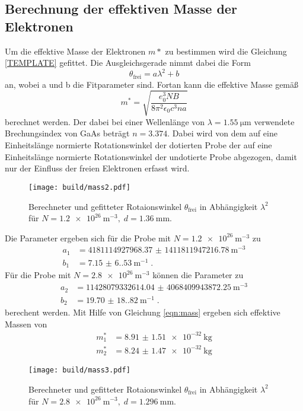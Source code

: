 \subsection{Berechnung der effektiven Masse der Elektronen}
Um die effektive Masse der Elektronen $m*$ zu bestimmen wird die Gleichung \eqref{TEMPLATE} gefittet.
Die Ausgleichsgerade nimmt dabei die Form 
\begin{equation*}
    \theta_\text{frei} = a \lambda^2 + b
\end{equation*}
an, wobei a und b die Fitparameter sind.
Fortan kann die effektive Masse gemäß
\begin{equation}
    m^* = \sqrt{\frac{e_0^3 NB }{8 \pi^2 \epsilon_0 c^3 na}} \label{eqn:mass}
\end{equation}
berechnet werden.
Der dabei bei einer Wellenlänge von $\lambda = \qty{1.55}{\micro\metre}$ verwendete Brechungsindex von GaAs beträgt $n = 3.374$\cite{brechungsindex}.
Dabei wird von dem auf eine Einheitslänge normierte Rotationswinkel der dotierten Probe der auf eine Einheitslänge normierte Rotationswinkel der undotierte Probe abgezogen,
damit nur der Einfluss der freien Elektronen erfasst wird.
\begin{figure}
    \centering
    \texttt{[image: build/mass2.pdf]}
    \caption{Berechneter und gefitteter Rotaionswinkel $\theta_\text{frei}$ in Abhängigkeit $\lambda^2$ für $
    N=\qty{1.2e26}{\meter\tothe{-3}}, \; d = \qty{1,36}{\milli\meter}$.}
    \label{fig:mass2}
\end{figure}
Die Parameter ergeben sich für die Probe mit $N=\qty{1.2e26}{\meter\tothe{-3}}$ zu
\begin{align*}
    a_1 &= \qty{4181114927968.37(141181194721678)}{\metre\tothe{-3}} \\
    b_1 &= \qty{7.15(6.53)}{\metre\tothe{-1}} \; \text{.}
\end{align*}
Für die Probe mit $N=\qty{2.8e26}{\meter\tothe{-3}}$ können die Parameter zu
\begin{align*}
    a_2 &= \qty{11428079332614.04(406840994387225)}{\metre\tothe{-3}} \\
    b_2 &= \qty{19.70(18.82)}{\metre\tothe{-1}} \; \text{.}
\end{align*}
berechent werden.
Mit Hilfe von Gleichung \eqref{eqn:mass} ergeben sich effektive Massen von 
\begin{align*}
    m^*_1&= \qty{8.91(151)e-32}{\kilo\gram} \\
    m^*_2&= \qty{8.24(147)e-32}{\kilo\gram}
\end{align*} 
\begin{figure}
    \centering
    \texttt{[image: build/mass3.pdf]}
    \caption{Berechneter und gefitteter Rotaionswinkel $\theta_\text{frei}$ in Abhängigkeit $\lambda^2$ für $
    N=\qty{2.8e26}{\meter\tothe{-3}}, \; d = \qty{1,296}{\milli\meter}$.}
    \label{fig:mass3}
\end{figure}